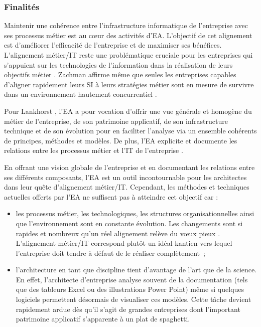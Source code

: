 \subsubsection{Finalités}

Maintenir une cohérence entre l'infrastructure informatique de l'entreprise
avec ses processus métier est au cœur des activités
d'EA\cite{lankhorst2013enterprise}. L'objectif de cet alignement est
d'améliorer l'efficacité de l'entreprise et de maximiser ses bénéfices.
L'alignement métier/IT reste une problématique cruciale pour les entreprises
qui s'appuient sur les technologies de l'information dans la réalisation de leurs
objectifs métier \cite{kaisler_enterprise_2005}. Zachman affirme même que
seules les entreprises capables d'aligner rapidement leurs SI à leurs
stratégies métier sont en mesure de survivre dans un environnement hautement
concurrentiel \cite{zachman1997enterprise}.
	
Pour Lankhorst \cite{lankhorst2013enterprise}, l'EA a pour vocation d'offrir une vue
générale et homogène du métier de l'entreprise, de son patrimoine applicatif,
de son infrastructure technique et de son évolution pour en faciliter
l'analyse via un ensemble cohérents de principes, méthodes et modèles. De plus, l'EA explicite et documente les relations entre les processus métier et
l'IT de l'entreprise \cite{kaisler_enterprise_2005}. 
	
En offrant une vision globale de l'entreprise et en documentant les
relations entre ses différents composants, l'EA est un outil incontournable
pour les architectes dans leur quête d'alignement métier/IT. Cependant, les
méthodes et techniques actuelles offerts par l'EA ne suffisent pas à atteindre
cet objectif \cite{barn2013enterprise} car :
\begin{itemize}
\item les processus métier, les technologiques, les structures organisationnelles
ainsi que l'environnement sont en constante évolution. Les changements sont si
rapides et nombreux qu'un réel alignement relève du vœux pieux
\cite{lankhorst2013enterprise}. L'alignement métier/IT correspond plutôt un
idéal kantien vers lequel l'entreprise doit tendre à défaut de le réaliser
complètement~;

\item l'architecture en tant que discipline tient d'avantage de l'art que de la science. En effet, l'architecte d'entreprise analyse souvent de la documentation (tels que des tableurs Excel ou des
illustrations Power Point) même si quelques logiciels permettent désormais de
visualiser ces modèles. Cette tâche devient rapidement ardue dès qu'il s'agit
de grandes entreprises dont l'important patrimoine applicatif s'apparente à un
plat de spaghetti.
\end{itemize}

